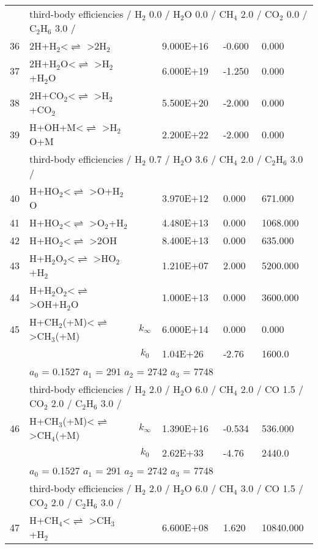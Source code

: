 \documentclass[11pt]{article}
\begin{document}
\begin{table}[hbt]
\begin{tabular}{|r l c l l l|}
	&\multicolumn{5}{l|}{third-body efficiencies  / H$_{2}$ 0.0 / H$_{2}$O 0.0 / CH$_{4}$ 2.0 / CO$_{2}$ 0.0 / C$_{2}$H$_{6}$ 3.0 /}\\ 
36 &	2H+H$_{2}$<$\rightleftharpoons$ >2H$_{2}$&	&	9.000E+16&	-0.600&	0.000\\ 
37 &	2H+H$_{2}$O<$\rightleftharpoons$ >H$_{2}$+H$_{2}$O&	&	6.000E+19&	-1.250&	0.000\\ 
38 &	2H+CO$_{2}$<$\rightleftharpoons$ >H$_{2}$+CO$_{2}$&	&	5.500E+20&	-2.000&	0.000\\ 
39 &	H+OH+M<$\rightleftharpoons$ >H$_{2}$O+M&	&	2.200E+22&	-2.000&	0.000\\ 
	&\multicolumn{5}{l|}{third-body efficiencies  / H$_{2}$ 0.7 / H$_{2}$O 3.6 / CH$_{4}$ 2.0 / C$_{2}$H$_{6}$ 3.0 /}\\ 
40 &	H+HO$_{2}$<$\rightleftharpoons$ >O+H$_{2}$O&	&	3.970E+12&	0.000&	671.000\\ 
41 &	H+HO$_{2}$<$\rightleftharpoons$ >O$_{2}$+H$_{2}$&	&	4.480E+13&	0.000&	1068.000\\ 
42 &	H+HO$_{2}$<$\rightleftharpoons$ >2OH&	&	8.400E+13&	0.000&	635.000\\ 
43 &	H+H$_{2}$O$_{2}$<$\rightleftharpoons$ >HO$_{2}$+H$_{2}$&	&	1.210E+07&	2.000&	5200.000\\ 
44 &	H+H$_{2}$O$_{2}$<$\rightleftharpoons$ >OH+H$_{2}$O&	&	1.000E+13&	0.000&	3600.000\\ 
45 &	H+CH$_{2}$(+M)<$\rightleftharpoons$ >CH$_{3}$(+M)&	$k_{\infty}$&	6.000E+14&	0.000&	0.000\\ 
	&	&	$k_0$&	1.04E+26&-2.76&	 1600.0\\ 
	&\multicolumn{5}{l|}{	$a_0$ = 0.1527	$a_1$ = 291	$a_2$ = 2742	$a_3$ = 7748}\\ 
	&\multicolumn{5}{l|}{third-body efficiencies  / H$_{2}$ 2.0 / H$_{2}$O 6.0 / CH$_{4}$ 2.0 / CO 1.5 / CO$_{2}$ 2.0 / C$_{2}$H$_{6}$ 3.0 /}\\ 
46 &	H+CH$_{3}$(+M)<$\rightleftharpoons$ >CH$_{4}$(+M)&	$k_{\infty}$&	1.390E+16&	-0.534&	536.000\\ 
	&	&	$k_0$&	2.62E+33&-4.76&	 2440.0\\ 
	&\multicolumn{5}{l|}{	$a_0$ = 0.1527	$a_1$ = 291	$a_2$ = 2742	$a_3$ = 7748}\\ 
	&\multicolumn{5}{l|}{third-body efficiencies  / H$_{2}$ 2.0 / H$_{2}$O 6.0 / CH$_{4}$ 3.0 / CO 1.5 / CO$_{2}$ 2.0 / C$_{2}$H$_{6}$ 3.0 /}\\ 
47 &	H+CH$_{4}$<$\rightleftharpoons$ >CH$_{3}$+H$_{2}$&	&	6.600E+08&	1.620&	10840.000\\ 

\end{tabular}
\end{table}
\end{document}
